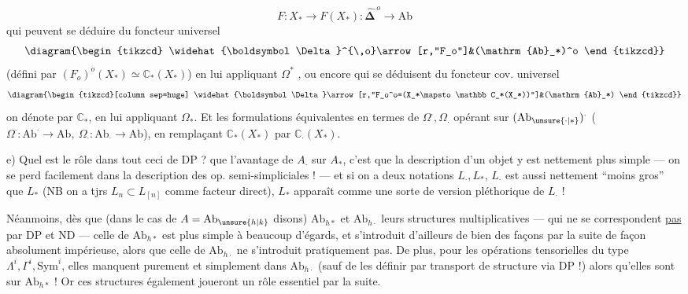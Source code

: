 
\[
F:X_*\longrightarrow F(X_*):\widehat{\boldsymbol\Delta}^{\,o}\longrightarrow\mathrm{Ab}
\]
qui peuvent se déduire du foncteur universel
\[
\diagram{\begin{tikzcd}
\widehat{\boldsymbol\Delta}^{\,o}\arrow[r,"F_o"]&(\mathrm{Ab}_*)^o
\end{tikzcd}}
\]
(défini par $(F_o)^o(X_*)\simeq\mathbb C_*(X_*)$) en lui appliquant  $\Omega^*$ , ou encore qui se déduisent du foncteur cov. universel
\[
\diagram{\begin{tikzcd}[column sep=huge]
\widehat{\boldsymbol\Delta}\arrow[r,"F_o^o=(X_*\mapsto\mathbb C_*(X_*))"]&(\mathrm{Ab}_*)
\end{tikzcd}}
\]
 on dénote par $\mathbb C_*$, en lui appliquant  $\Omega_*$. Et les  formulations équivalentes en termes de $\Omega^\cdot,\Omega_\cdot$ opérant sur $(\mathrm{Ab}_{\unsure{\cdot|*}})^\cdot$ ($\Omega^\cdot:\mathrm{Ab}^\cdot\longrightarrow\mathrm{Ab},\ \Omega_\cdot:\mathrm{Ab}_\cdot\longrightarrow\mathrm{Ab}$), en remplaçant $\mathbb C_*(X_*)$ par $\mathbb C_\cdot(X_*)$.

e) Quel est le rôle dans tout ceci de $\mathrm{DP}$ ?  que l’avantage de $A_\cdot$ sur $A_*$, c’est que la description d’un objet y est nettement plus simple --- on se perd facilement dans la description des op. semi-simpliciales ! --- et si on a deux notations $L_\cdot,L_*$, $L_\cdot$ est aussi nettement ``moins gros'' que $L_*$ (NB on a tjrs $L_n\subset L_{[n]}$ comme facteur direct), $L_*$ apparaît comme une sorte de version pléthorique de $L_\cdot$ !

Néanmoins, dès que (dans le cas de $A=\mathrm{Ab}_{\unsure{h|k}}$ disons) $\mathrm{Ab}_{h*}$ et $\mathrm{Ab}_{h\cdot}$   leurs structures multiplicatives --- qui ne se correspondent \uline{pas} par DP et ND --- celle de $\mathrm{Ab}_{h*}$ est plus simple à beaucoup d’égards, et s’introduit d’ailleurs de bien des façons par la suite de façon absolument impérieuse, alors que celle de $\mathrm{Ab}_{h\cdot}$ ne s’introduit pratiquement pas.
De plus, pour les opérations tensorielles du type $\Lambda^i,\Gamma^i,\mathrm{Sym}^i$, elles manquent purement et simplement dans $\mathrm{Ab}_{h\cdot}$ (sauf de les définir par transport de structure via DP !) alors qu’elles sont   sur $\mathrm{Ab}_{h*}$ ! Or ces structures également joueront un rôle essentiel par la suite.


